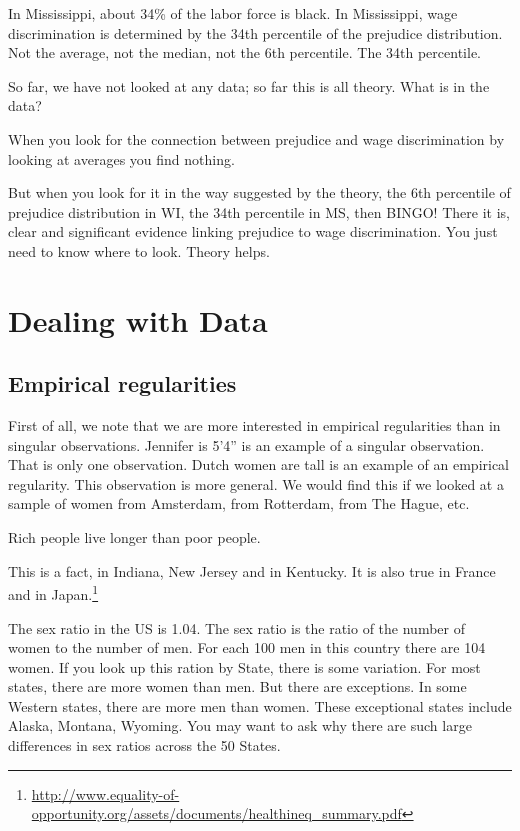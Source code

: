 \documentclass[
]{book}
\begin{document}
In Mississippi, about 34\% of the labor force is black. In Mississippi, wage discrimination is determined by the 34th percentile of the prejudice distribution. Not the average, not the median, not the 6th percentile. The 34th percentile.

So far, we have not looked at any data; so far this is all theory.
What is in the data?

When you look for the connection between prejudice and wage discrimination by looking at averages you find nothing.

But when you look for it in the way suggested by the theory, the 6th percentile of prejudice distribution in WI, the 34th percentile in MS, then BINGO! There it is, clear and significant evidence linking prejudice to wage discrimination. You just need to know where to look. Theory helps.

\hypertarget{dealing-with-data}{%
\section{Dealing with Data}\label{dealing-with-data}}

\hypertarget{empirical-regularities}{%
\subsection{Empirical regularities}\label{empirical-regularities}}

First of all, we note that we are more interested in empirical regularities than in singular observations. Jennifer is 5'4'' is an example of a singular observation. That is only one observation. Dutch women are tall is an example of an empirical regularity. This observation is more general. We would find this if we looked at a sample of women from Amsterdam, from Rotterdam, from The Hague, etc.

Rich people live longer than poor people.

This is a fact, in Indiana, New Jersey and in Kentucky. It is also true in France and in Japan.\footnote{\url{http://www.equality-of-opportunity.org/assets/documents/healthineq_summary.pdf}}

The sex ratio in the US is 1.04. The sex ratio is the ratio of the number of women to the number of men. For each 100 men in this country there are 104 women. If you look up this ration by State, there is some variation. For most states, there are more women than men. But there are exceptions. In some Western states, there are more men than women. These exceptional states include Alaska, Montana, Wyoming. You may want to ask why there are such large differences in sex ratios across the 50 States.
\end{document}
